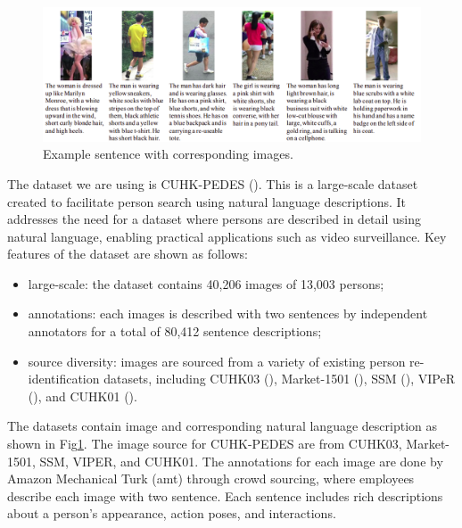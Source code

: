 \begin{figure}[htbp]
  \begin{center}
      \includegraphics[width=\linewidth]{img/cuhk_pedes.png}
      \caption{Example sentence with corresponding images.}
      \label{fig:cuhk_pedes}
  \end{center}
\end{figure}


The dataset we are using is CUHK-PEDES (\cite{li2017personsearchnaturallanguage}). This is a large-scale dataset created to facilitate person search using natural language descriptions. It addresses the need for a dataset where persons are described in detail using natural language, enabling practical applications such as video surveillance. Key features of the dataset are shown as follows:
\begin{itemize}
  \item large-scale: the dataset contains 40,206 images of 13,003 persons; 
  \item annotations: each images is described with two sentences by independent annotators for a total of 80,412 sentence descriptions;
  \item source diversity: images are sourced from a variety of existing person re-identification datasets, including CUHK03 (\cite{li2014deepreid}), Market-1501 (\cite{7410490}), SSM (\cite{ssm}), VIPeR (\cite{viper}), and CUHK01 (\cite{li2012human}).
\end{itemize}

The datasets contain image and corresponding natural language description as shown in Fig\ref{fig:cuhk_pedes}. The image source for CUHK-PEDES are from CUHK03, Market-1501, SSM, VIPER, and CUHK01. The annotations for each image are done by Amazon Mechanical Turk (\acrshort{amt}) through crowd sourcing, where employees describe each image with two sentence. Each sentence includes rich descriptions about a person's appearance, action poses, and interactions.

